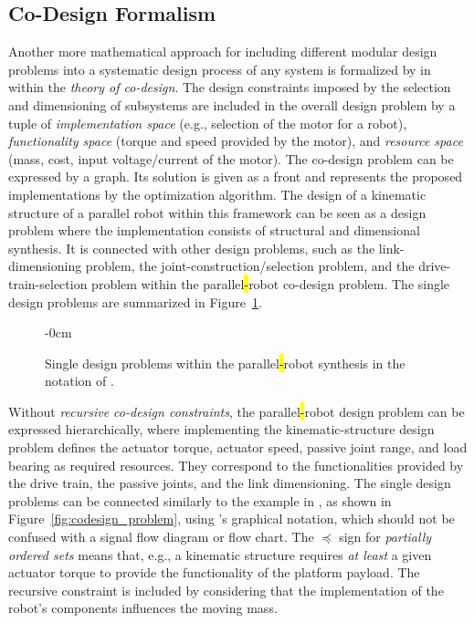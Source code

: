 \subsection{Co-Design Formalism}
\label{sec:ds_codesign}

Another more mathematical approach for including different modular design problems into a systematic design process of any system is formalized by  in \cite{Censi2015} within the \emph{theory of co-design}.
The design constraints imposed by the selection and dimensioning of subsystems are included in the overall design problem by a tuple of \emph{implementation space} (e.g., selection of the motor for a robot), \emph{functionality space} (torque and speed provided by the motor), and \emph{resource space} (mass, cost, input voltage/current of the motor).
The co-design problem can be expressed by a graph.
Its solution is given as a  front and represents the proposed implementations by the optimization algorithm.
The design of a kinematic structure of a parallel robot within this framework can be seen as a design problem where the implementation consists of structural and dimensional synthesis.
It is connected with other design problems, such as the link-dimensioning problem, the joint-construction/selection problem, and the drive-train-selection problem within the parallel\hl{-}robot co-design problem.
The single design problems are summarized in Figure~\ref{fig:codesign_modules}.

\vspace{-3pt}
\begin{figure}[H]
  \begin{adjustwidth}{-\extralength}{0cm}
    \centering
    \graphicspath{{Figures}}
    
  \end{adjustwidth}
  \caption{Single design problems within the parallel\hl{-}robot synthesis in the notation of \cite{Censi2015}.}  %
  \label{fig:codesign_modules}
\end{figure}


Without \emph{recursive co-design constraints}, the parallel\hl{-}robot design problem can be expressed hierarchically, where implementing the kinematic-structure design problem defines the actuator torque, actuator speed, passive joint range, and load bearing as required resources.
%
They correspond to the functionalities provided by the drive train, the passive joints, and the link dimensioning.
The single design problems can be connected similarly to the example in \cite{Censi2015}, as shown in Figure~\ref{fig:codesign_problem}, using 's graphical notation, which should not be confused with a signal flow diagram or flow chart.
The $\preccurlyeq$ %
%
sign for \emph{partially ordered sets} means that, e.g., a kinematic structure requires \emph{at least} a given actuator torque to provide the functionality of the platform payload.
The recursive constraint is included by considering that the implementation of the robot's components influences the moving mass. %

